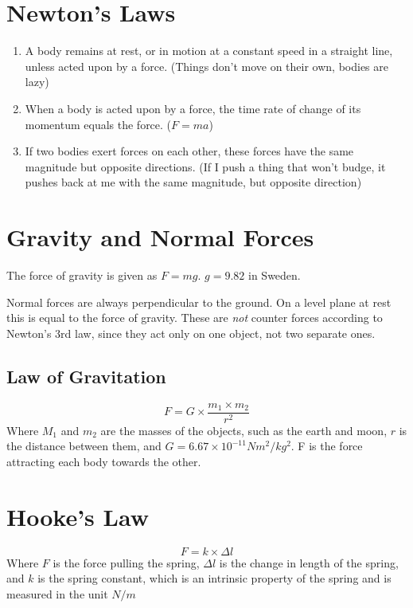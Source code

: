 \documentclass{article}
\begin{document}
\section*{Newton's Laws}
	\begin{enumerate}
		\item A body remains at rest, or in motion at a constant speed in a straight line, unless acted upon by a force. (Things don't move on their own, bodies are lazy)
		\item When a body is acted upon by a force, the time rate of change of its momentum equals the force. ($F=ma$)
		\item If two bodies exert forces on each other, these forces have the same magnitude but opposite directions. (If I push a thing that won't budge, it pushes back at me with the same magnitude, but opposite direction)
	\end{enumerate}
\section*{Gravity and Normal Forces}
	The force of gravity is given as $F=mg$. $g=9.82$ in Sweden.

	Normal forces are always perpendicular to the ground. On a level plane at rest this is equal to the force of gravity. These are \emph{not} counter forces according to Newton's 3rd law, since they act only on one object, not two separate  ones.
	\subsection*{Law of Gravitation}
		\begin{multicols}{2}
			\[F=G \times \frac{m_{1} \times m_{2}}{r^{2}}\] \break \break
			Where $M_{1}$ and $m_{2}$ are the masses of the objects, such as the earth and moon, $r$ is the distance between them, and $G=6.67 \times 10^{-11} Nm^2 / kg^2$. F is the force attracting each body towards the other.
		\end{multicols}
\section*{Hooke's Law}
	\begin{multicols}{2}
		\[F = k \times \Delta l\] \break \break
		Where $F$ is the force pulling the spring, $\Delta l$ is the change in length of the spring, and $k$ is the spring constant, which is an intrinsic property of the spring and is measured in the unit $N/m$
	\end{multicols}
\end{document}
